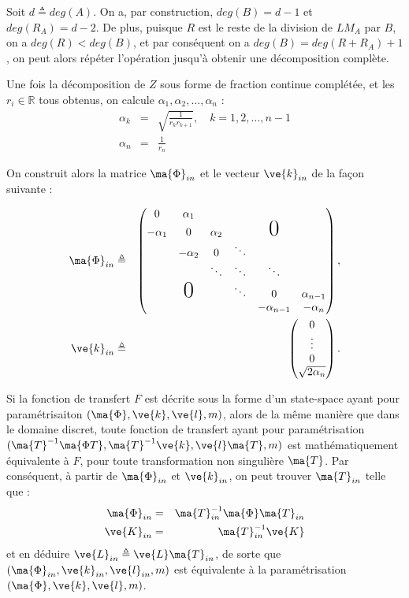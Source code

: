Soit $d\triangleq deg(A)$. On a, par construction, $deg(B)=d-1$ et $deg(R_A)=d-2$. De plus, puisque $R$ est le reste de la division de $LM_A$ par $B$, on a $deg(R) < deg(B)$, et par conséquent on a $deg(B)=deg(R+R_A)+1$, on peut alors répéter l'opération jusqu'à obtenir une décomposition complète.

Une fois la décomposition  de $Z$ sous forme de fraction continue complétée, et les $r_i\in \mathbb{R}$ tous obtenus, on calcule $\alpha_1,\alpha_2,\ldots, \alpha_n$ :
\begin{eqnarray}
\alpha_k & = & \sqrt{\frac{1}{r_kr_{k+1}}},\quad k =1,2,\ldots, n-1\\
\alpha_n & = & \frac{1}{r_n}
\end{eqnarray}

On construit alors la matrice $\ma{\Phi}_{in}$ et le vecteur $\ve{k}_{in}$ de la façon suivante :

\begin{eqnarray}
\ma{\Phi}_{in} & \triangleq & 
\begin{pmatrix}
	0 & \alpha_1 &   & &  &  \\
	-\alpha_1 & 0 & \alpha_2  &  & \text{\huge0} & \\
	 & -\alpha_2 & 0 & \ddots  &  & \\
	 &   & \ddots & \ddots & \ddots &  \\
	 & \text{\huge0} &  & \ddots & 0 & \alpha_{n-1}\\
	 &  &  &  & -\alpha_{n-1} & -\alpha_n\\
\end{pmatrix},\label{eq:phi_in}\\
\ve{k}_{in} & \triangleq &
\begin{pmatrix}
	0 \\
	\vdots \\
	0 \\
	\sqrt{2\alpha_n}\\
\end{pmatrix}.\label{eq:k_in}
\end{eqnarray}

Si la fonction de transfert $F$ est décrite sous la forme d'un state-space ayant pour paramétrisaiton $(\ma{\Phi}, \ve{k}, \ve{l},m)$, alors de la même manière que dans le domaine discret, toute fonction de transfert ayant pour paramétrisation $(\ma{T}^{-1}\ma{\Phi T}, \ma{T}^{-1}\ve{k},\ve{l}\ma{T},m)$ est mathématiquement équivalente à $F$, pour toute transformation non singulière $\ma{T}$. Par conséquent, à partir de $\ma{\Phi}_{in}$ et $\ve{k}_{in}$, on peut trouver $\ma{T}_{in}$ telle que :
\begin{eqnarray}
\ma{\Phi}_{in}&=&\ma{T}_{in}^{-1}\ma{\Phi}\ma{T}_{in}\\
\ve{K}_{in} &=& \ma{T}_{in}^{-1}\ve{K}
\end{eqnarray}
et en déduire $\ve{L}_{in} \triangleq \ve{L}\ma{T}_{in}$, de sorte que $(\ma{\Phi}_{in}, \ve{k}_{in}, \ve{l}_{in},m)$ est équivalente à la paramétrisation $(\ma{\Phi}, \ve{k}, \ve{l},m)$.


